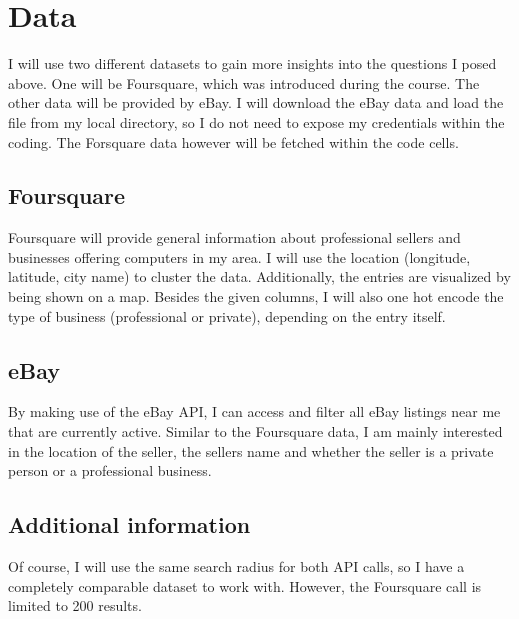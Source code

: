 \chapter{Data}
I will use two different datasets to gain more insights into the questions I posed above. One will be Foursquare, which was introduced during the course. The other data will be provided by eBay. I will download the eBay data and load the file from my local directory, so I do not need to expose my credentials within the coding. The Forsquare data however will be fetched within the code cells.
\section{Foursquare}
Foursquare will provide general information about professional sellers and businesses offering computers in my area. I will use the location (longitude, latitude, city name) to cluster the data. Additionally, the entries are visualized by being shown on a map. Besides the given columns, I will also one hot encode the type of business (professional or private), depending on the entry itself.
\section{eBay}
By making use of the eBay API, I can access and filter all eBay listings near me that are currently active. Similar to the Foursquare data, I am mainly interested in the location of the seller, the sellers name and whether the seller is a private person or a professional business.
\section{Additional information}
Of course, I will use the same search radius for both API calls, so I have a completely comparable dataset to work with. However, the Foursquare call is limited to 200 results.